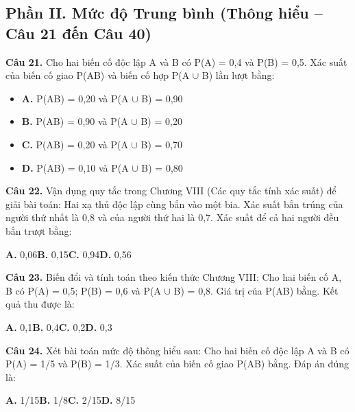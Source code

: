 \documentclass[11pt,a4paper]{article}
\begin{document}
\subsection*{\color{accent} Phần II. Mức độ Trung bình (Thông hiểu -- Câu 21 đến Câu 40)}
\textbf{\color{primary} Câu 21.} Cho hai biến cố độc lập A và B có P(A) = 0,4 và P(B) = 0,5. Xác suất của biến cố giao P(AB) và biến cố hợp P(A $\cup$ B) lần lượt bằng:\par
\begin{itemize}\setlength{\itemsep}{1pt}\setlength{\parskip}{0pt}
  \item[] \textbf{A.} P(AB) = 0,20 và P(A $\cup$ B) = 0,90
  \item[] \textbf{B.} P(AB) = 0,90 và P(A $\cup$ B) = 0,20
  \item[] \textbf{C.} P(AB) = 0,20 và P(A $\cup$ B) = 0,70
  \item[] \textbf{D.} P(AB) = 0,10 và P(A $\cup$ B) = 0,80
\end{itemize}\vspace{2pt}
\textbf{\color{primary} Câu 22.} Vận dụng quy tắc trong Chương VIII (Các quy tắc tính xác suất) để giải bài toán: Hai xạ thủ độc lập cùng bắn vào một bia. Xác suất bắn trúng của người thứ nhất là 0,8 và của người thứ hai là 0,7. Xác suất để cả hai người đều bắn trượt bằng:\par
\hspace*{1.5em}\textbf{A.} 0,06\quad\quad \textbf{B.} 0,15\quad\quad \textbf{C.} 0,94\quad\quad \textbf{D.} 0,56\par\vspace{2pt}
\textbf{\color{primary} Câu 23.} Biến đổi và tính toán theo kiến thức Chương VIII: Cho hai biến cố A, B có P(A) = 0,5; P(B) = 0,6 và P(A $\cup$ B) = 0,8. Giá trị của P(AB) bằng. Kết quả thu được là:\par
\hspace*{1.5em}\textbf{A.} 0,1\quad\quad \textbf{B.} 0,4\quad\quad \textbf{C.} 0,2\quad\quad \textbf{D.} 0,3\par\vspace{2pt}
\textbf{\color{primary} Câu 24.} Xét bài toán mức độ thông hiểu sau: Cho hai biến cố độc lập A và B có P(A) = 1/5 và P(B) = 1/3. Xác suất của biến cố giao P(AB) bằng. Đáp án đúng là:\par
\hspace*{1.5em}\textbf{A.} 1/15\quad\quad \textbf{B.} 1/8\quad\quad \textbf{C.} 2/15\quad\quad \textbf{D.} 8/15\par\vspace{2pt}
\end{document}
